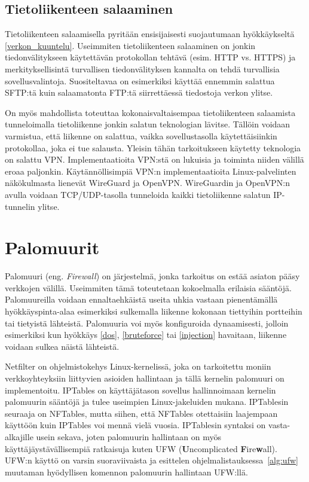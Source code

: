 \subsection{Tietoliikenteen salaaminen}\label{tietoliikenteen_salaaminen}

Tietoliikenteen salaamisella pyritään ensisijaisesti suojautumaan hyökkäykseltä \ref{verkon_kuuntelu}. Useimmiten tietoliikenteen salaaminen on jonkin tiedonvälitykseen käytettävän protokollan tehtävä (esim. HTTP vs. HTTPS) ja merkityksellisintä turvallisen tiedonvälityksen kannalta on tehdä turvallisia sovellusvalintoja. Suositeltavaa on esimerkiksi käyttää ennemmin salattua SFTP:tä kuin salaamatonta FTP:tä siirrettäessä tiedostoja verkon ylitse.

On myös mahdollista toteuttaa kokonaisvaltaisempaa tietoliikenteen salaamista tunneloimalla tietoliikenne jonkin salatun teknologian lävitse. Tällöin voidaan varmistua, että liikenne on salattua, vaikka sovellustasolla käytettäisiinkin protokollaa, joka ei tue salausta. Yleisin tähän tarkoitukseen käytetty teknologia on salattu VPN. Implementaatioita VPN:stä on lukuisia ja toiminta niiden välillä eroaa paljonkin. Käytännöllisimpiä VPN:n implementaatioita Linux-palvelinten näkökulmasta lienevät WireGuard ja OpenVPN. WireGuardin ja OpenVPN:n avulla voidaan TCP/UDP-tasolla tunneloida kaikki tietoliikenne salatun IP-tunnelin ylitse.~\cite{ciampa2012security+}

\section{Palomuurit}\label{palomuurit}
Palomuuri (eng. \textit{Firewall}) on järjestelmä, jonka tarkoitus on estää asiaton pääsy verkkojen välillä. Useimmiten tämä toteutetaan kokoelmalla erilaisia sääntöjä. Palomuureilla voidaan ennaltaehkäistä useita uhkia vastaan pienentämällä hyökkäyspinta-alaa esimerkiksi sulkemalla liikenne kokonaan tiettyihin portteihin tai tietyistä lähteistä. Palomuuria voi myös konfiguroida dynaamisesti, jolloin esimerkiksi kun hyökkäys \ref{dos}, \ref{bruteforce} tai \ref{injection} havaitaan, liikenne voidaan sulkea näistä lähteistä.~\cite{ciampa2012security+}

Netfilter on ohjelmistokehys Linux-kernelissä, joka on tarkoitettu moniin verkkoyhteyksiin liittyvien asioiden hallintaan ja tällä kernelin palomuuri on implementoitu. IPTables on käyttäjätason sovellus hallinnoimaan kernelin palomuurin sääntöjä ja tulee useimpien Linux-jakeluiden mukana. IPTablesin seuraaja on NFTables, mutta siihen, että NFTables otettaisiin laajempaan käyttöön kuin IPTables voi mennä vielä vuosia. IPTablesin syntaksi on vasta-alkajille usein sekava, joten palomuurin hallintaan on myös käyttäjäystävällisempiä ratkaisuja kuten UFW (\textbf{U}ncomplicated \textbf{F}ire\textbf{w}all). UFW:n käyttö on varsin suoraviivaista ja esittelen ohjelmalistauksessa~\ref{alg:ufw} muutaman hyödyllisen komennon palomuurin hallintaan UFW:llä.~\cite{binnie2016linux}~\cite{ufw}

